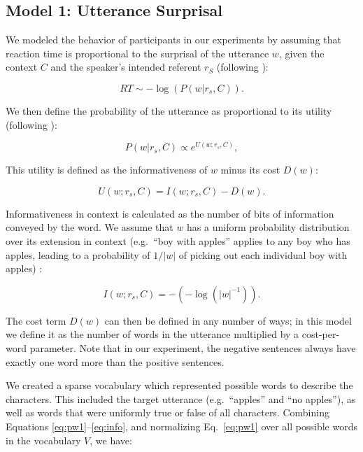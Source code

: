 \documentclass[10pt,letterpaper]{article}
\begin{document}
\subsection{Model 1: Utterance Surprisal}

We modeled the behavior of participants in our experiments by assuming that reaction time is proportional to the surprisal of the utterance $w$, given the context $C$ and the speaker's intended referent $r_S$ (following ):

\begin{equation}\label{eq:surprise}
RT \sim -\log(P(w| r_s, C)).
\end{equation}

\noindent We then define the probability of the utterance as proportional to its utility (following ):

\begin{equation}\label{eq:pw1}
P(w | r_s, C) \propto  e^{U(w;r_s,C)},
\end{equation} 

\noindent This utility is defined as the informativeness of $w$ minus its cost $D(w)$:

\begin{equation}\label{eq:utility}
U(w;r_s,C) = I(w;r_s, C) - D(w).
\end{equation}

\noindent Informativeness in context is calculated as the number of bits of information conveyed by the word. We assume that $w$ has a uniform probability distribution over its extension in context (e.g.\ ``boy with apples'' applies to any boy who has apples, leading to a probability of $1/|w|$ of picking out each individual boy with apples) :

\begin{equation}\label{eq:info}
I(w;r_s, C) = -(-\log(|w|^{-1})).
\end{equation}

\noindent The cost term $D(w)$ can then be defined in any number of ways; in this model we define it as the number of words in the utterance multiplied by a cost-per-word parameter.  Note that in our experiment, the negative sentences always have exactly one word more than the positive sentences. 

We created a sparse vocabulary which represented possible words to describe the characters.  This included the target utterance (e.g.\ ``apples'' and ``no apples''), as well as words that were uniformly true or false of all characters. Combining Equations \ref{eq:pw1}--\ref{eq:info}, and normalizing Eq.\ \ref{eq:pw1} over all possible words in the vocabulary $V$, we have:
\end{document}

